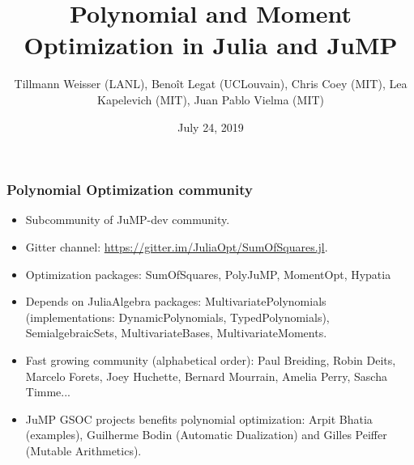 \documentclass{beamer}
\title{Polynomial and Moment Optimization in Julia and JuMP}
\date{July 24, 2019}
\author{Tillmann Weisser (LANL), Beno\^it Legat (UCLouvain), Chris Coey (MIT), Lea Kapelevich (MIT), Juan Pablo Vielma (MIT)}
\begin{document}
  \maketitle

\begin{frame}
  \frametitle{Polynomial Optimization community}
  \begin{itemize}
    \item Subcommunity of JuMP-dev community.
    \item Gitter channel: \url{https://gitter.im/JuliaOpt/SumOfSquares.jl}.
    \item Optimization packages: SumOfSquares, PolyJuMP, MomentOpt, Hypatia
    \item Depends on JuliaAlgebra packages: MultivariatePolynomials (implementations: DynamicPolynomials, TypedPolynomials),
      SemialgebraicSets, MultivariateBases, MultivariateMoments.
    \item Fast growing community (alphabetical order):
      Paul Breiding,
      Robin Deits,
      Marcelo
      Forets,
      Joey Huchette,
      Bernard Mourrain,
      Amelia Perry,
      Sascha Timme...
    \item JuMP GSOC projects benefits polynomial optimization:
      Arpit Bhatia (examples),
      Guilherme Bodin (Automatic Dualization) and
      Gilles Peiffer (Mutable Arithmetics).
  \end{itemize}
\end{frame}
\end{document}
